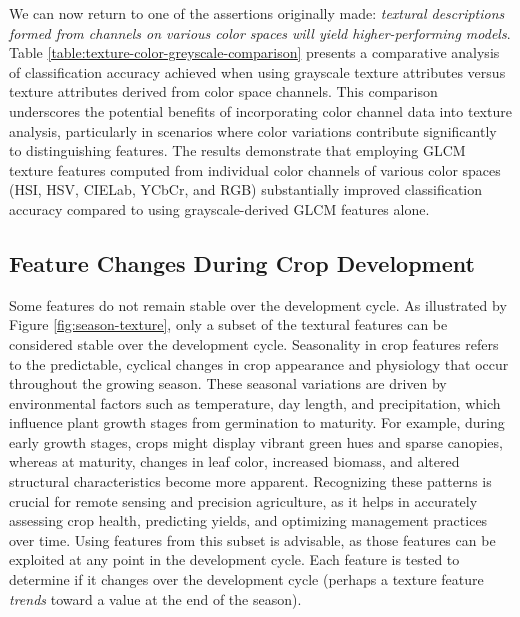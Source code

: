 \documentclass[letterpaper]{report}
\begin{document}
We can now return to one of the assertions originally made: \textit{textural descriptions formed from channels on various color spaces will yield higher-performing models}. Table \ref{table:texture-color-greyscale-comparison} presents a comparative analysis of classification accuracy achieved when using grayscale texture attributes versus texture attributes derived from color space channels. This comparison underscores the potential benefits of incorporating color channel data into texture analysis, particularly in scenarios where color variations contribute significantly to distinguishing features. The results demonstrate that employing GLCM texture features computed from individual color channels of various color spaces (HSI, HSV, CIELab, YCbCr, and RGB) substantially improved classification accuracy compared to using grayscale-derived GLCM features alone. 
{
\renewcommand{\arraystretch}{0.9}

%
%

}



\subsection{Feature Changes During Crop Development}
Some features do not remain stable over the development cycle. As illustrated by Figure \ref{fig:season-texture}, only a subset of the textural features can be considered stable over the development cycle. Seasonality in crop features refers to the predictable, cyclical changes in crop appearance and physiology that occur throughout the growing season. These seasonal variations are driven by environmental factors such as temperature, day length, and precipitation, which influence plant growth stages from germination to maturity. For example, during early growth stages, crops might display vibrant green hues and sparse canopies, whereas at maturity, changes in leaf color, increased biomass, and altered structural characteristics become more apparent. Recognizing these patterns is crucial for remote sensing and precision agriculture, as it helps in accurately assessing crop health, predicting yields, and optimizing management practices over time. Using features from this subset is advisable, as those features can be exploited at any point in the development cycle.  Each feature is tested to determine if it changes over the development cycle (perhaps a texture feature \textit{trends} toward a value at the end of the season).
\end{document}
